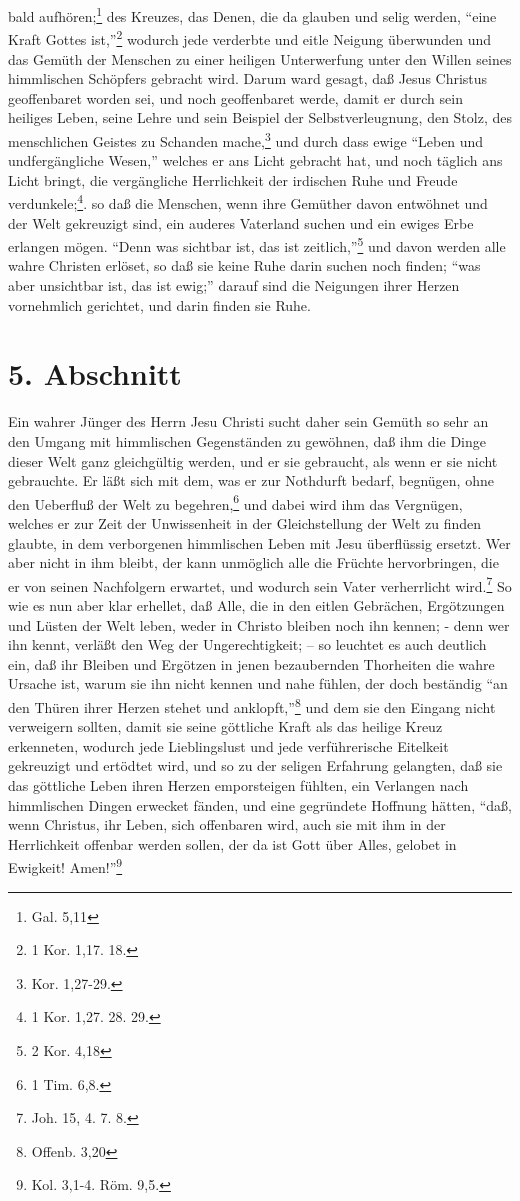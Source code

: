 bald aufhören;\footnote{Gal. 5,11} des Kreuzes, das Denen, die da glauben und
selig werden, "`eine Kraft Gottes ist,"'\footnote{1 Kor. 1,17. 18.} wodurch jede
verderbte und eitle Neigung überwunden und das Gemüth der Menschen zu einer
heiligen Unterwerfung unter den Willen seines himmlischen Schöpfers gebracht
wird. Darum ward gesagt, daß Jesus Christus geoffenbaret worden sei, und noch
geoffenbaret werde, damit er durch sein heiliges Leben, seine Lehre und sein
Beispiel der Selbstverleugnung, den Stolz, des menschlichen Geistes zu Schanden
mache,\footnote{Kor. 1,27-29.} und durch dass ewige "`Leben und undfergängliche
Wesen,"' welches er ans Licht gebracht hat, und noch täglich ans Licht bringt,
die vergängliche Herrlichkeit der irdischen Ruhe und Freude
verdunkele;\footnote{1 Kor. 1,27. 28. 29.}. so daß die Menschen, wenn ihre
Gemüther davon entwöhnet und der Welt gekreuzigt sind, ein auderes Vaterland
suchen und ein ewiges Erbe erlangen mögen. "`Denn was sichtbar ist, das ist
zeitlich,"'\footnote{2 Kor. 4,18} und davon werden alle wahre Christen erlöset,
so daß sie keine Ruhe darin suchen noch finden; "`was aber unsichtbar ist, das
ist ewig;"' darauf sind die Neigungen ihrer Herzen vornehmlich gerichtet, und
darin finden sie Ruhe.

\section{5. Abschnitt}

Ein wahrer Jünger des Herrn Jesu Christi sucht daher sein Gemüth so sehr an den
Umgang mit himmlischen Gegenständen zu gewöhnen, daß ihm die Dinge dieser Welt
ganz gleichgültig werden, und er sie gebraucht, als wenn er sie nicht
gebrauchte. Er läßt sich mit dem, was er zur Nothdurft bedarf, begnügen, ohne
den Ueberfluß der Welt zu begehren,\footnote{1 Tim. 6,8.} und dabei wird ihm das
Vergnügen, welches er zur Zeit der Unwissenheit in der Gleichstellung der Welt
zu finden glaubte, in dem verborgenen himmlischen Leben mit Jesu überflüssig
ersetzt. Wer aber nicht in ihm bleibt, der kann unmöglich alle die Früchte
hervorbringen, die er von seinen Nachfolgern erwartet, und wodurch sein Vater
verherrlicht wird.\footnote{Joh. 15, 4. 7. 8.} So wie es nun aber klar erhellet,
daß Alle, die in den eitlen Gebrächen, Ergötzungen und Lüsten der Welt leben,
weder in Christo bleiben noch ihn kennen; - denn wer ihn kennt, verläßt den Weg
der Ungerechtigkeit; -- so leuchtet es auch deutlich ein, daß ihr Bleiben und
Ergötzen in jenen bezaubernden Thorheiten die wahre Ursache ist, warum sie ihn
nicht kennen und nahe fühlen, der doch beständig "`an den Thüren ihrer Herzen
stehet und anklopft,"'\footnote{Offenb. 3,20} und dem sie den Eingang nicht
verweigern sollten, damit sie seine göttliche Kraft als das heilige Kreuz
erkenneten, wodurch jede Lieblingslust und jede verführerische Eitelkeit
gekreuzigt und ertödtet wird, und so zu der seligen Erfahrung gelangten, daß sie
das göttliche Leben ihren Herzen emporsteigen fühlten, ein Verlangen nach
himmlischen Dingen erwecket fänden, und eine gegründete Hoffnung hätten, "`daß,
wenn Christus, ihr Leben, sich offenbaren wird, auch sie mit ihm in der
Herrlichkeit offenbar werden sollen, der da ist Gott über Alles, gelobet in
Ewigkeit! Amen!"'\footnote{Kol. 3,1-4. Röm. 9,5.}
